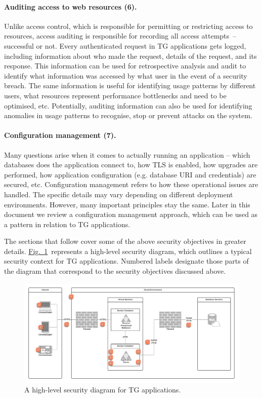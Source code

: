 \documentclass[a4paper,12pt,oneside,openright]{memoir}
\begin{document}
	\paragraph{Auditing access to web resources (6).}
		Unlike access control, which is responsible for permitting or restricting access to resources, access auditing is responsible for recording all access attempts~-- successful or not.
		Every authenticated request in TG applications gets logged, including information about who made the request, details of the request, and its response.
		This information can be used for retrospective analysis and audit to identify what information was accessed by what user in the event of a security breach.
		The same information is useful for identifying usage patterns by different users, what resources represent performance bottlenecks and need to be optimised, etc.
		Potentially, auditing information can also be used for identifying anomalies in usage patterns to recognise, stop or prevent attacks on the system.

	\paragraph{Configuration management (7).}
		Many questions arise when it comes to actually running an application -- which databases does the application connect to, how TLS is enabled, how upgrades are performed, how application configuration (e.g. database URI and credentials) are secured, etc.
		Configuration management refers to how these operational issues are handled.
		The specific details may vary depending on different deployment environments.
		However, many important principles stay the same.
		Later in this document we review a configuration management approach, which can be used as a pattern in relation to TG applications.

	\bigskip
	The sections that follow cover some of the above security objectives in greater details.
	\hyperref[sec:01:fig:1]{Fig.~\ref*{sec:01:fig:1}}~represents a high-level security diagram, which outlines a typical security context for TG applications.
	Numbered labels designate those parts of the diagram that correspond to the security objectives discussed above.

	\begin{figure}[h!tbp]
	\centering
	\includegraphics[width=1\linewidth]{images/01-security-diagram.png}
	\caption{A high-level security diagram for TG applications.}\label{sec:01:fig:1}
	\end{figure}
\end{document}
